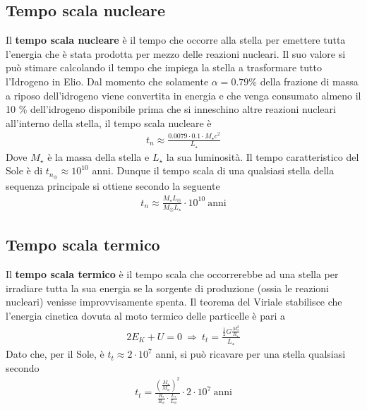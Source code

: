 \documentclass[a4paper, oneside]{book}
\begin{document}
\subsection{Tempo scala nucleare}
Il \textbf{tempo scala nucleare} è il tempo che occorre alla stella per emettere tutta l'energia che
è stata prodotta per mezzo delle reazioni nucleari. Il suo valore si può stimare calcolando il tempo che impiega 
la stella a trasformare tutto l'Idrogeno in Elio. Dal momento che solamente $\alpha = 0.79 \%$ della frazione di massa 
a riposo dell'idrogeno viene convertita in energia e che venga consumato almeno il 10 \% dell'idrogeno disponibile prima 
che si inneschino altre reazioni nucleari all'interno della stella, il tempo scala nucleare è
\begin{align}
    t_n \approx \frac{0.0079 \cdot 0.1 \cdot M_\star c^{2}}{L_\star}
\end{align}
Dove $M_\star$ è la massa della stella e $L_\star$ la sua luminosità. Il tempo 
caratteristico del Sole è di $t_{n_\circledcirc} \approx 10^{10}$ anni. Dunque il tempo scala di una 
qualsiasi stella della sequenza principale si ottiene secondo la seguente
\begin{align}
    t_n \approx \frac{M_\star L_\circledcirc}{M_\circledcirc L_\star} \cdot 10^{10} \ \text{anni}
\end{align}
\subsection{Tempo scala termico}
Il \textbf{tempo scala termico} è il tempo scala che occorrerebbe ad una stella per irradiare tutta la 
sua energia se la sorgente di produzione (ossia le reazioni nucleari) venisse improvvisamente spenta. Il 
teorema del Viriale stabilisce che l'energia cinetica dovuta al moto termico delle particelle è pari a 
\begin{align}
    2E_K + U = 0 \ \Longrightarrow \ t_t = \frac{\frac{1}{2}G \frac{M_\star^{2}}{R_\star}}{L_\star}
\end{align}
Dato che, per il Sole, è $t_t \approx 2 \cdot 10^{7}$ anni, si può ricavare per una stella qualsiasi secondo 
\begin{align}
    t_t = \frac{\left(\frac{M_\star}{M_\circledcirc}\right)^{2}}{\frac{R_\star}{R_\circledcirc}\cdot \frac{L_\star}{L_\circledcirc}} \cdot  2\cdot 10^{7} \ \text{anni}
\end{align}
\end{document}
